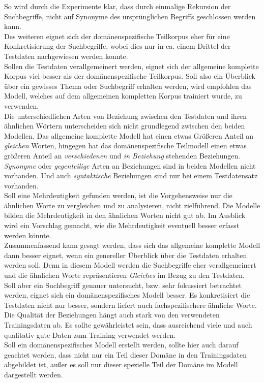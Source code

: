 \documentclass[12pt,a4paper]{report}
\begin{document}
So wird durch die Experimente klar, dass durch einmalige Rekursion der Suchbegriffe, nicht auf Synonyme des ursprünglichen Begriffs geschlossen werden kann.\\
Des weiteren eignet sich der domänenspezifische Teilkorpus eher für eine Konkretisierung der Suchbegriffe, wobei dies nur in ca. einem Drittel der Testdaten nachgewiesen werden konnte. \\
Sollen die Testdaten verallgemeinert werden, eignet sich der allgemeine komplette Korpus viel besser als der domänenspezifische Teilkorpus. Soll also ein Überblick über ein gewisses Thema oder Suchbegriff erhalten werden, wird empfohlen das Modell, welches auf dem allgemeinen kompletten Korpus trainiert wurde, zu verwenden.\\
Die unterschiedlichen Arten von Beziehung zwischen den Testdaten und ihren ähnlichen Wörtern unterscheiden sich nicht grundlegend zwischen den beiden Modellen. Das allgemeine komplette Modell hat einen etwas Größeren Anteil an \textit{gleichen} Worten, hingegen hat das domänenspezifische Teilmodell einen etwas größeren Anteil an \textit{verschiedenen} und \textit{in Beziehung} stehenden Beziehungen. \textit{Synonyme} oder \textit{gegenteilige} Arten an Beziehungen sind in beiden Modellen nicht vorhanden. Und auch \textit{syntaktische} Beziehungen sind nur bei einem Testdatensatz vorhanden.\\
Soll eine Mehrdeutigkeit gefunden werden, ist die Vorgehensweise nur die ähnlichen Worte zu vergleichen und zu analysieren, nicht zielführend. Die Modelle bilden die Mehrdeutigkeit in den ähnlichen Worten nicht gut ab. Im Ausblick wird ein Vorschlag gemacht, wie die Mehrdeutigkeit eventuell besser erfasst werden könnte.\\


Zusammenfassend kann gesagt werden, dass sich das allgemeine komplette Modell dann besser eignet, wenn ein genereller Überblick über die Testdaten erhalten werden soll. Denn in diesem Modell werden die Suchbegriffe eher verallgemeinert und die ähnlichen Worte repräsentieren \textit{Gleiches} im Bezug zu den Testdaten.\\
Soll aber ein Suchbegriff genauer untersucht, bzw. sehr fokussiert betrachtet werden, eignet sich ein domänenspezifisches Modell besser. Es konkretisiert die Testdaten nicht nur besser, sondern liefert auch fachspezifischere ähnliche Worte.\\

Die Qualität der Beziehungen hängt auch stark von den verwendeten Trainingsdaten ab. Es sollte gewährleistet sein, dass ausreichend viele und auch qualitativ gute Daten zum Training verwendet werden.\\
Soll ein domänenspezifisches Modell erstellt werden, sollte hier auch darauf geachtet werden, dass nicht nur ein Teil dieser Domäne in den Trainingsdaten abgebildet ist, außer es soll nur dieser spezielle Teil der Domäne im Modell dargestellt werden.\\
\end{document}
